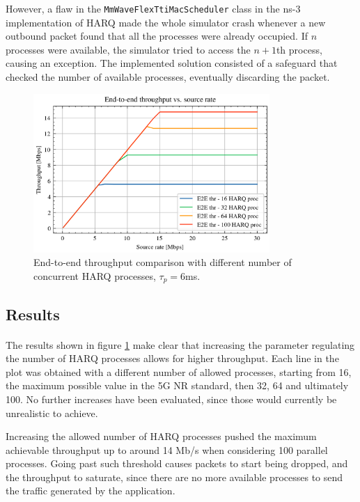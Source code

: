 However, a flaw in the \texttt{MmWaveFlexTtiMacScheduler} class in the ns-3 implementation of \ac{HARQ} made the whole simulator crash whenever a new outbound packet found that all the processes were already occupied. If $n$ processes were available, the simulator tried to access the $n+1$th process, causing an exception. The implemented solution consisted of a safeguard that checked the number of available processes, eventually discarding the packet. 


\begin{figure}[ht]
    \centering
    \includegraphics[width=0.8\textwidth]{res/thr_processes.png}
    \caption{End-to-end throughput comparison with different number of concurrent \ac{HARQ} processes, $\tau_p=6$ms.}
    \label{fig:harq-numproc}
\end{figure}

\subsection{Results}
\paragraph{}
The results shown in figure \ref{fig:harq-numproc} make clear that increasing the parameter regulating the number of \ac{HARQ} processes allows for higher throughput. Each line in the plot was obtained with a different number of allowed processes, starting from 16, the maximum possible value in the 5G \ac{NR} standard, then 32, 64 and ultimately 100. No further increases have been evaluated, since those would currently be unrealistic to achieve.

Increasing the allowed number of \ac{HARQ} processes pushed the maximum achievable throughput up to around 14 Mb/s when considering 100 parallel processes. Going past such threshold causes packets to start being dropped, and the throughput to saturate, since there are no more available processes to send the traffic generated by the application.

